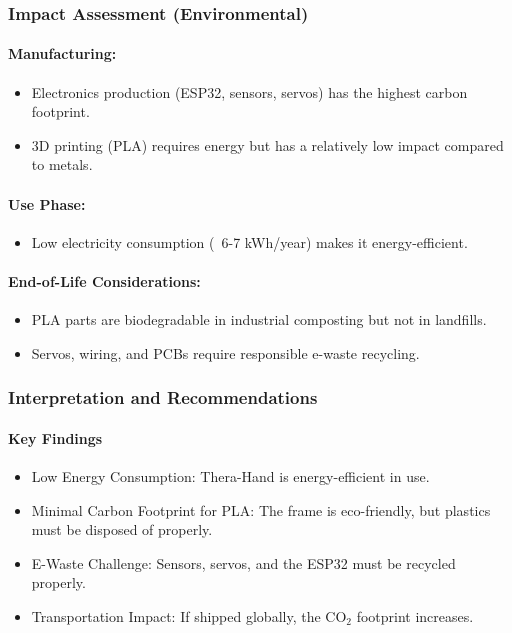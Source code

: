 \documentclass{article}
\begin{document}
\subsubsection{Impact Assessment (Environmental)}
\paragraph{Manufacturing:}
\begin{itemize}
\item Electronics production (ESP32, sensors, servos) has the highest carbon footprint.
\item 3D printing (PLA) requires energy but has a relatively low impact compared to metals.
\end{itemize}
\paragraph{Use Phase:}
\begin{itemize}
\item Low electricity consumption (~6-7 kWh/year) makes it energy-efficient.
\end{itemize}
\paragraph{End-of-Life Considerations:}
\begin{itemize}
\item PLA parts are biodegradable in industrial composting but not in landfills.
\item Servos, wiring, and PCBs require responsible e-waste recycling.
\end{itemize}
\subsubsection{Interpretation and Recommendations}
\paragraph{Key Findings}
\begin{itemize}
    \item Low Energy Consumption: Thera-Hand is energy-efficient in use.
    \item Minimal Carbon Footprint for PLA: The frame is eco-friendly, but plastics must be disposed
of properly.
    \item E-Waste Challenge: Sensors, servos, and the ESP32 must be recycled properly.
    \item Transportation Impact: If shipped globally, the CO$_2$ footprint increases.
\end{itemize}
\end{document}

